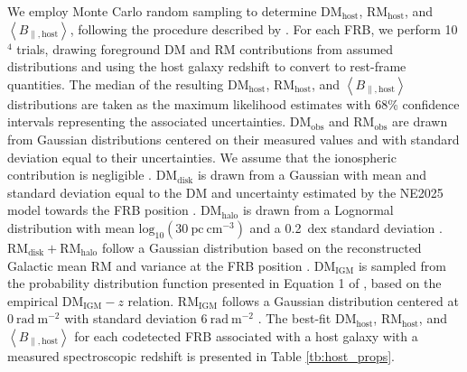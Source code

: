 \documentclass[twocolumn, linenumbers]{aastex701}
\begin{document}
We employ Monte Carlo random sampling to determine $\mathrm{DM}_\mathrm{host}$, $\mathrm{RM}_\mathrm{host}$, and $\left<B_{\parallel,\mathrm{host}}\right>$, following the procedure described by \cite{2025ApJ...982..146P}. For each FRB, we perform 10$^4$ trials, drawing foreground DM and RM contributions from assumed distributions and using the host galaxy redshift to convert to rest-frame quantities. The median of the resulting $\mathrm{DM}_\mathrm{host}$, $\mathrm{RM}_\mathrm{host}$, and $\left<B_{\parallel,\mathrm{host}}\right>$ distributions are taken as the maximum likelihood estimates with 68\% confidence intervals representing the associated uncertainties. $\mathrm{DM}_\mathrm{obs}$ and $\mathrm{RM}_\mathrm{obs}$ are drawn from Gaussian distributions centered on their measured values and with standard deviation equal to their uncertainties. We assume that the ionospheric contribution is negligible \citep[typically $\mathrm{DM}_\mathrm{ion} \lesssim 10^{-5}~\mathrm{pc}~\mathrm{cm}^{-3}$ and $\mathrm{RM}_\mathrm{ion} \lesssim 1~\mathrm{rad}~\mathrm{m}^{-2}$;][]{2016ApJ...821...66L, 2019MNRAS.484.3646S}. $\mathrm{DM}_{\mathrm{disk}}$ is drawn from a Gaussian with mean and standard deviation equal to the DM and uncertainty estimated by the NE2025 model towards the FRB position \citep{2026arXiv260211838O}. $\mathrm{DM}_\mathrm{halo}$ is drawn from a Lognormal distribution with mean $\mathrm{log}_{10}(30~\mathrm{pc}~\mathrm{cm}^{-3})$ and a 0.2~dex standard deviation \citep{2015MNRAS.451.4277D,2020ApJ...888..105Y,2023ApJ...946...58C}. $\mathrm{RM}_{\mathrm{disk}} + \mathrm{RM}_{\mathrm{halo}}$ follow a Gaussian distribution based on the reconstructed Galactic mean RM and variance at the FRB position \citep{2022A&A...657A..43H}. $\mathrm{DM}_\mathrm{IGM}$ is sampled from the probability distribution function presented in Equation 1 of \cite{2024ApJ...965...57B}, based on the empirical $\mathrm{DM}_\mathrm{IGM} - z$ relation. $\mathrm{RM}_\mathrm{IGM}$ follows a Gaussian distribution centered at $0~\mathrm{rad}~\mathrm{m}^{-2}$ with standard deviation $6~\mathrm{rad}~\mathrm{m}^{-2}$ \citep{2010MNRAS.409L..99S}. The best-fit $\mathrm{DM}_\mathrm{host}$, $\mathrm{RM}_\mathrm{host}$, and $\left<B_{\parallel,\mathrm{host}}\right>$ for each codetected FRB associated with a host galaxy with a measured spectroscopic redshift is presented in Table \ref{tb:host_props}.
\end{document}
